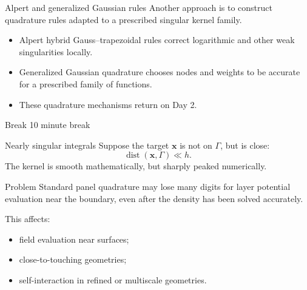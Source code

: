 \documentclass[aspectratio=169,11pt]{beamer}
\newcommand{\x}{\bm{x}}
\DeclareMathOperator{\dist}{dist}
\begin{document}
\begin{frame}{Alpert and generalized Gaussian rules}
\small
Another approach is to construct quadrature rules adapted to a prescribed
singular kernel family.

\begin{itemize}
  \item Alpert hybrid Gauss--trapezoidal rules correct logarithmic and other
  weak singularities locally.
  \item Generalized Gaussian quadrature chooses nodes and weights to be
  accurate for a prescribed family of functions.
  \item These quadrature mechanisms return on Day 2.
\end{itemize}
\end{frame}

\begin{frame}{Break}
\centering
\Large 10 minute break
\end{frame}

\begin{frame}{Nearly singular integrals}
\small
Suppose the target $\x$ is not on $\Gamma$, but is close:
\[
  \dist(\x,\Gamma)\ll h.
\]
The kernel is smooth mathematically, but sharply peaked numerically.

\begin{block}{Problem}
Standard panel quadrature may lose many digits for layer potential evaluation
near the boundary, even after the density has been solved accurately.
\end{block}

This affects:
\begin{itemize}
  \item field evaluation near surfaces;
  \item close-to-touching geometries;
  \item self-interaction in refined or multiscale geometries.
\end{itemize}
\end{frame}
\end{document}
